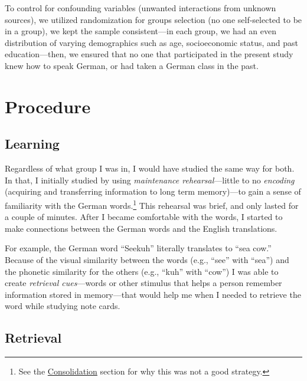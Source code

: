 \documentclass[stu,12pt,floatsintext]{apa7}
\begin{document}
To control for confounding variables (unwanted interactions from unknown sources), we utilized randomization for groups selection (no one self-selected to be in a group), we kept the sample consistent---in each group, we had an even distribution of varying demographics such as age, socioeconomic status, and past education---then, we ensured that no one that participated in the present study knew how to speak German, or had taken a German class in the past.

\renewcommand{\theenumi}{\arabic{enumi}}
\renewcommand{\labelenumi}{\theenumi.}
\section{Procedure}

\subsection{Learning}

Regardless of what group I was in, I would have studied the same way for both. In that, I initially studied by using \textit{maintenance rehearsal}---little to no \textit{encoding} (acquiring and transferring information to long term memory)---to gain a sense of familiarity with the German words.\footnote{See the \hyperlink{consolidation}{Consolidation} section for why this was not a good strategy.} This rehearsal was brief, and only lasted for a couple of minutes. After I became comfortable with the words, I started to make connections between the German words and the English translations. 

For example, the German word ``Seekuh'' literally translates to ``sea cow.'' Because of the visual similarity between the words (e.g., ``see'' with ``sea'') and the phonetic similarity for the others (e.g., ``kuh'' with ``cow'') I was able to create \textit{retrieval cues}---words or other stimulus that helps a person remember information stored in memory---that would help me when I needed to retrieve the word while studying note cards.

\subsection{Retrieval}
\end{document}

